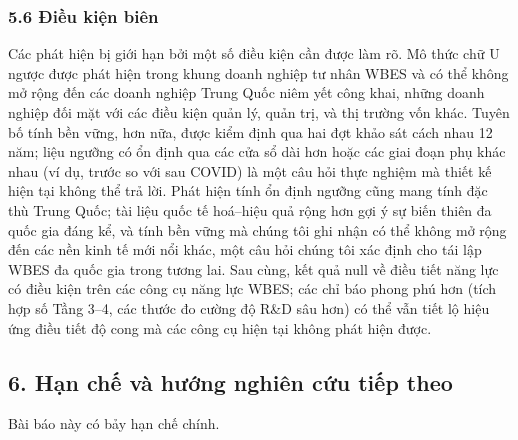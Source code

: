 \documentclass[12pt,a4paper]{article}
\begin{document}
\hypertarget{56-ux111iux1ec1u-kiux1ec7n-biuxean}{%
\subsubsection{5.6 Điều kiện
biên}\label{56-ux111iux1ec1u-kiux1ec7n-biuxean}}

Các phát hiện bị giới hạn bởi một số điều kiện cần được làm rõ. Mô thức
chữ U ngược được phát hiện trong khung doanh nghiệp tư nhân WBES và có
thể không mở rộng đến các doanh nghiệp Trung Quốc niêm yết công khai,
những doanh nghiệp đối mặt với các điều kiện quản lý, quản trị, và thị
trường vốn khác. Tuyên bố tính bền vững, hơn nữa, được kiểm định qua hai
đợt khảo sát cách nhau 12 năm; liệu ngưỡng có ổn định qua các cửa sổ dài
hơn hoặc các giai đoạn phụ khác nhau (ví dụ, trước so với sau COVID) là
một câu hỏi thực nghiệm mà thiết kế hiện tại không thể trả lời. Phát
hiện tính ổn định ngưỡng cũng mang tính đặc thù Trung Quốc; tài liệu
quốc tế hoá--hiệu quả rộng hơn gợi ý sự biến thiên đa quốc gia đáng kể,
và tính bền vững mà chúng tôi ghi nhận có thể không mở rộng đến các nền
kinh tế mới nổi khác, một câu hỏi chúng tôi xác định cho tái lập WBES đa
quốc gia trong tương lai. Sau cùng, kết quả null về điều tiết năng lực
có điều kiện trên các công cụ năng lực WBES; các chỉ báo phong phú hơn
(tích hợp số Tầng 3--4, các thước đo cường độ R\&D sâu hơn) có thể vẫn
tiết lộ hiệu ứng điều tiết độ cong mà các công cụ hiện tại không phát
hiện được.

\hypertarget{6-hux1ea1n-chux1ebf-vuxe0-hux1b0ux1edbng-nghiuxean-cux1ee9u-tiux1ebfp-theo}{%
\subsection{6. Hạn chế và hướng nghiên cứu tiếp
theo}\label{6-hux1ea1n-chux1ebf-vuxe0-hux1b0ux1edbng-nghiuxean-cux1ee9u-tiux1ebfp-theo}}

Bài báo này có bảy hạn chế chính.
\end{document}
